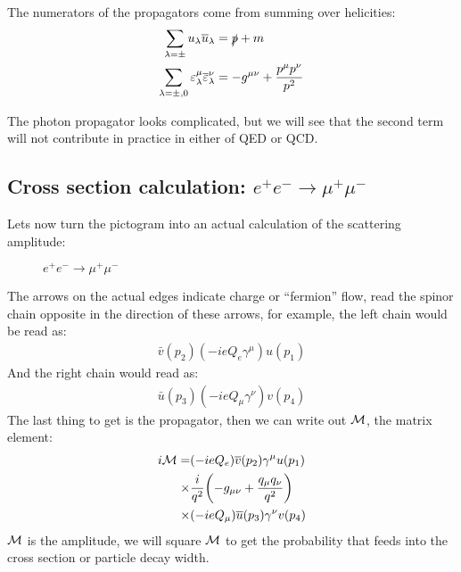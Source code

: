 The numerators of the propagators come from summing over helicities:
\begin{align*}
  \sum_{\lambda=\pm}u_\lambda\overline{u}_\lambda&=\slashed{p}+m\\
  \sum_{\lambda=\pm,0}\varepsilon^\mu_\lambda\overline{\varepsilon}^\nu_\lambda&=
  -g^{\mu\nu}+\frac{p^\mu p^\nu}{p^2}
\end{align*}

The photon propagator looks complicated, but we will see that the second term will not contribute in practice in either of QED or QCD.\@

\subsection{Cross section calculation: $e^+e^-\to\mu^+\mu^-$}
Lets now turn the pictogram into an actual calculation of the scattering amplitude:
\begin{figure}[H]
  \centering
  \caption{$e^+e^-\to\mu^+\mu^-$}\label{fig:feynman}
\end{figure}
The arrows on the actual edges indicate charge or ``fermion'' flow, read the spinor chain opposite in the direction of these arrows, for example, the left chain would be read as:
\begin{align*}
  \bar{v}(p_2)(-ieQ_e\gamma^\mu)u(p_1)
\end{align*}
And the right chain would read as:
\begin{align*}
  \bar{u}(p_3)(-ieQ_\mu\gamma^\nu)v(p_4)
\end{align*}
The last thing to get is the propagator, then we can write out $\mathcal{M}$, the matrix element:
\begin{align*}
  i\mathcal{M}=&(-ieQ_e)\overline{v}(p_2)\gamma^\mu u(p_1)\\
  \times&\frac{i}{q^2}\qty(-g_{\mu\nu}+\frac{q_\mu q_\nu}{q^2})\\
  \times&(-ieQ_\mu)\overline{u}(p_3)\gamma^\nu v(p_4)
\end{align*}
$\mathcal{M}$ is the amplitude, we will square $\mathcal{M}$ to get the probability that feeds into the cross section or particle decay width.


